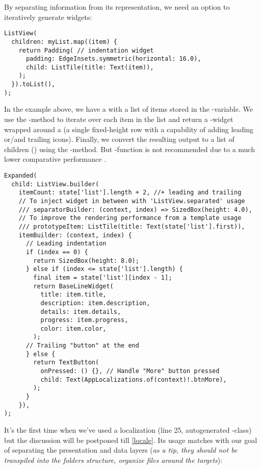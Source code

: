 \noindent By separating information from its representation, we need an option to iteratively generate widgets:

\begin{lstlisting}
ListView(
  children: myList.map((item) {
    return Padding( // indentation widget
      padding: EdgeInsets.symmetric(horizontal: 16.0),
      child: ListTile(title: Text(item)),
    );
  }).toList(),
);
\end{lstlisting}

\noindent In the example above, we have a  with a list of items stored in the -variable. We use 
the -method to iterate over each item in the list and return a -widget wrapped around a 
 (a single fixed-height row with a capability of adding leading or/and trailing icons). Finally, we convert 
the resulting output  to a list of children () using the -method. 
But -function is not recommended due to a much lower comparative performance \cite{HanT21}.

\begin{lstlisting}
Expanded(
  child: ListView.builder(
    itemCount: state['list'].length + 2, //+ leading and trailing
    // To inject widget in between with 'ListView.separated' usage
    /// separatorBuilder: (context, index) => SizedBox(height: 4.0),
    // To improve the rendering performance from a template usage
    /// prototypeItem: ListTile(title: Text(state['list'].first)),
    itemBuilder: (context, index) {
      // Leading indentation
      if (index == 0) { 
        return SizedBox(height: 8.0);
      } else if (index <= state['list'].length) {
        final item = state['list'][index - 1];
        return BaseLineWidget(
          title: item.title,
          description: item.description,
          details: item.details,
          progress: item.progress,
          color: item.color,
        );
      // Trailing "button" at the end
      } else { 
        return TextButton(
          onPressed: () {}, // Handle "More" button pressed
          child: Text(AppLocalizations.of(context)!.btnMore),
        );
      }
    }),
);
\end{lstlisting}

\noindent It's the first time when we've used a localization (line 25, autogenerated -class) but the 
discussion will be postponed till \cref{locale}. Its usage matches with our goal of separating the presentation and data 
layers (\emph{as a tip, they should not be transpiled into the folders structure, organize files around the targets}):

